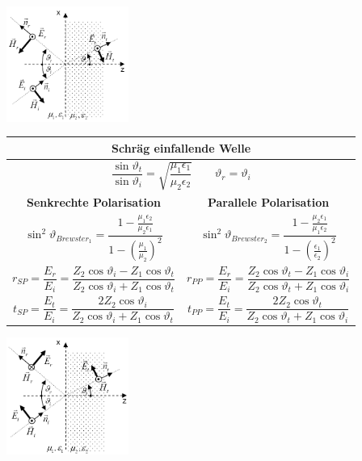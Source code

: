 		
		\begin{minipage}{4.3cm}
			\includegraphics[width=4cm]{./images/EMW_DHR_SchraegSenkrechtPolarisiert.png} 
        \end{minipage}
		\renewcommand{\arraystretch}{1.6}
		\begin{tabular}{| c || c | }
			\hline
				\multicolumn{2}{|c|}{\textbf{Schräg einfallende Welle}} \\
			\hline
				\multicolumn{2}{|c|}{$\dfrac{\sin{\vartheta_t}}{\sin{\vartheta_i}} = \sqrt{\dfrac{\mu_1
				\epsilon_1}{\mu_2 \epsilon_2}} \qquad \vartheta_r = \vartheta_i$} \\
			\hline
				\textbf{Senkrechte Polarisation}
				& 
				\textbf{Parallele Polarisation} \\	
			\hline		
				$ \sin^2 \vartheta_{Brewster_1} = \dfrac{1 - \frac{\mu_1 \epsilon_2}{\mu_2 \epsilon_1}}{1 -
				\left(\frac{\mu_1}{\mu_2}\right)^2}$ 
				& $ \sin^2 \vartheta_{Brewster_2} = \dfrac{1 - \frac{\mu_2 \epsilon_1}{\mu_1 \epsilon_2}}{1 -
				\left(\frac{\epsilon_1}{\epsilon_2}\right)^2}$ \\
				$r_{SP} = \dfrac{E_r}{E_i} = \dfrac{Z_2 \cos{\vartheta_i} - Z_1 \cos{\vartheta_t}}{Z_2
				\cos{\vartheta_i} + Z_1 \cos{\vartheta_t}}$
				& $r_{PP} = \dfrac{E_r}{E_i} = \dfrac{Z_2 \cos{\vartheta_t} - Z_1 \cos{\vartheta_i}}{Z_2
				\cos{\vartheta_t} + Z_1 \cos{\vartheta_i}}$ \\
				$t_{SP} =  \dfrac{E_t}{E_i} = \dfrac{2 Z_2 \cos{\vartheta_i}}{Z_2 \cos{\vartheta_i} + Z_1
				\cos{\vartheta_t}}$
				& $t_{PP} = \dfrac{E_t}{E_i} =  \dfrac{2 Z_2 \cos{\vartheta_t}}{Z_2 \cos{\vartheta_t} + Z_1
				\cos{\vartheta_i}}$ \\
			\hline
   		\end{tabular}
		\renewcommand{\arraystretch}{1}	
		\begin{minipage}{4.3cm}
			\includegraphics[width=4cm]{./images/EMW_DHR_SchraegParallelPolarisiert.png} 
        \end{minipage}	
		
